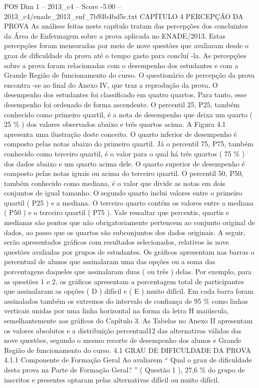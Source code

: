 \begin{textsample}{POS Dim 1 – 2013\_c4 – Score -5.00 – 2013\_c4/enade\_2013\_enf\_7b93b4bd5c.txt}  \label{ex:f1_pos_389}
CAPÍTULO 4 PERCEPÇÃO DA PROVA As análises feitas neste capítulo tratam das percepções dos concluintes da Área de Enfermagem sobre a prova aplicada no ENADE/2013.
Estas percepções foram mensuradas por meio de nove questões que avaliaram desde o grau de dificuldade da prova até o tempo gasto para concluí -la.
As percepções sobre a prova foram relacionadas com o desempenho dos estudantes e com a Grande Região de funcionamento do curso.
O questionário de percepção da prova encontra -se ao final do Anexo IV, que traz a reprodução da prova.
O desempenho dos estudantes foi classificado em quatro quartos.
Para tanto, esse desempenho foi ordenado de forma ascendente.
O percentil 25, P25, também conhecido como primeiro quartil, é a nota de desempenho que deixa um quarto ( 25 \% ) dos valores observados abaixo e três quartos acima.
A Figura 4.1 apresenta uma ilustração deste conceito.
O quarto inferior de desempenho é composto pelas notas abaixo do primeiro quartil.
Já o percentil 75, P75, também conhecido como terceiro quartil, é o valor para o qual há três quartos ( 75 \% ) dos dados abaixo e um quarto acima dele.
O quarto superior de desempenho é composto pelas notas iguais ou acima do terceiro quartil.
O percentil 50, P50, também conhecido como mediana, é o valor que divide as notas em dois conjuntos de igual tamanho.
O segundo quarto inclui valores entre o primeiro quartil ( P25 ) e a mediana.
O terceiro quarto contém os valores entre a mediana ( P50 ) e o terceiro quartil ( P75 ).
Vale ressaltar que percentis, quartis e medianas são pontos que não obrigatoriamente pertencem ao conjunto original de dados, ao passo que os quartos são subconjuntos dos dados originais.
A seguir, serão apresentados gráficos com resultados selecionados, relativos às nove questões avaliadas por grupos de estudantes.
Os gráficos apresentam nas barras o percentual de alunos que assinalaram uma das opções ou a soma das porcentagens daqueles que assinalaram duas ( ou três ) delas.
Por exemplo, para as questões 1 e 2, os gráficos apresentam a porcentagem total de participantes que assinalaram as opções ( D ) difícil e ( E ) muito difícil.
Em cada barra foram assinalados também os extremos do intervalo de confiança de 95 \% como linhas verticais unidas por uma linha horizontal na forma da letra H maiúscula, semelhantemente aos gráficos do Capítulo 3.
As Tabelas no Anexo II apresentam os valores absolutos e a distribuição percentual12 das alternativas válidas das nove questões, segundo o mesmo recorte de desempenho dos alunos e Grande Região de funcionamento do curso. 4.1 GRAU DE DIFICULDADE DA PROVA 4.1.1 Componente de Formação Geral Ao avaliarem “ Qual o grau de dificuldade desta prova na Parte de Formação Geral? ” ( Questão 1 ), 27,6 \% do grupo de inscritos e presentes optaram pelas alternativas difícil ou muito difícil.

\end{textsample}

